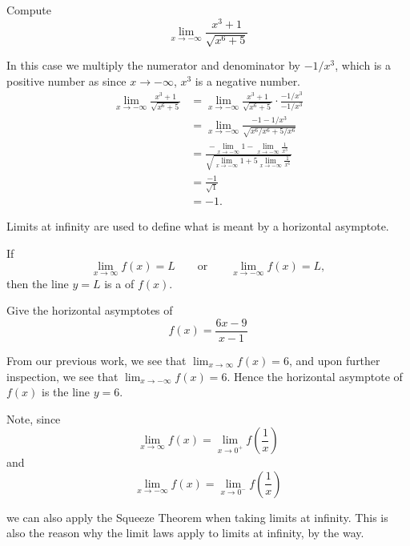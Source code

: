 \documentclass{ximera}
\begin{document}
\begin{example}
Compute
\[
\lim_{x\to -\infty} \frac{x^3+1}{\sqrt{x^6+5}}
\]
\begin{explanation}
In this case we multiply the numerator and denominator by $-1/x^3$,
which is a positive number as since $x\to -\infty$, $x^3$ is a negative
number.
\begin{align*}
\lim_{x\to -\infty} \frac{x^3+1}{\sqrt{x^6+5}} &= \lim_{x\to -\infty} \frac{x^3+1}{\sqrt{x^6+5}} \cdot \frac{-1/x^3}{-1/x^3}\\
&= \lim_{x\to -\infty} \frac{-1-1/x^3}{\sqrt{x^6/x^6+5/x^6}}\\
&= \frac{-\displaystyle\lim_{x\to -\infty} 1 - \displaystyle\lim_{x\to -\infty} \frac{1}{x^3}}{\sqrt{\displaystyle\lim_{x\to -\infty} 1 + 5\displaystyle\lim_{x\to -\infty} \frac{1}{x^6}}} \\
&= \frac{-1}{\sqrt{1}} \\
&= -1.
\end{align*}
\end{explanation}
\end{example}

Limits at infinity are used to define what is meant by a horizontal asymptote.

\begin{definition}
\label{def:horizasymptote}
If  
\[
\lim_{x\to \infty} f(x) = L \qquad\text{or}\qquad \lim_{x\to -\infty} f(x) = L,
\]
then the line $y=L$ is a  of $f(x)$.
\end{definition}

\begin{example} 
Give the horizontal asymptotes of
\[
f(x) = \frac{6x-9}{x-1}
\]
\begin{explanation}
From our previous work, we see that $\displaystyle\lim_{x\to \infty} f(x) = 6$, and
upon further inspection, we see that $\displaystyle\lim_{x\to -\infty} f(x) =
6$. Hence the horizontal asymptote of $f(x)$ is the line $y=6$.
\end{explanation}
\end{example}

Note, since
\[
\lim_{x\to \infty} f(x) = \lim_{x\to 0^+} f\left(\frac{1}{x}\right)
\]
and
\[
\lim_{x\to -\infty} f(x) = \lim_{x\to 0^-} f\left(\frac{1}{x}\right)
\]

we can also apply the Squeeze Theorem when taking limits at infinity.  This is also the reason why the limit laws apply to limits at infinity, by the way.  
\end{document}
